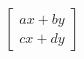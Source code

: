 \documentclass[preview]{standalone}
\begin{document}
\begin{align*}
\begin{bmatrix} ax + by \\ cx + dy \end{bmatrix}
\end{align*}
\end{document}
